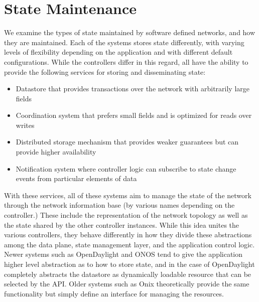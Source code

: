 \documentclass[letterpaper,twocolumn,10pt]{article}
\begin{document}

\section{State Maintenance}

We examine the types of state maintained by software defined networks, and how they are maintained. Each of the systems stores state differently, with varying levels of flexibility depending on the application and with different default configurations. While the controllers differ in this regard, all have the ability to provide the following services for storing and disseminating state:

\begin{itemize}
\item Datastore that provides transactions over the network with arbitrarily large fields
\item Coordination system that prefers small fields and is optimized for reads over writes
\item Distributed storage mechanism that provides weaker guarantees but can provide higher availability
\item Notification system where controller logic can subscribe to state change events from particular elements of data
\end{itemize}

With these services, all of these systems aim to manage the state of the network through the network information base (by various names depending on the controller.) These include the representation of the network topology as well as the state shared by the other controller instances. While this idea unites the various controllers, they behave differently in how they divide these abstractions among the data plane, state management layer, and the application control logic. Newer systems such as OpenDaylight and ONOS tend to give the application higher level abstraction as to how to store state, and in the case of OpenDaylight completely abstracts the datastore as dynamically loadable resource that can be selected by the API. Older systems such as Onix theoretically provide the same functionality but simply define an interface for managing the resources. 
\end{document}
